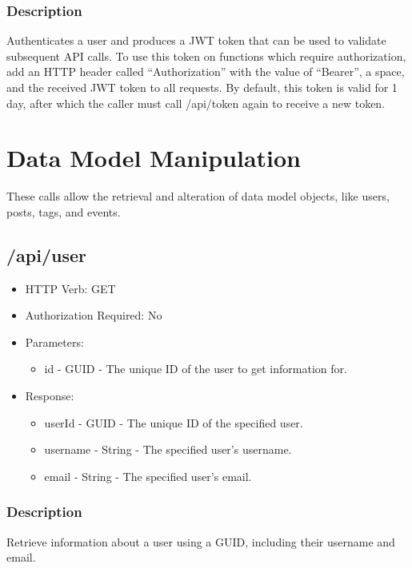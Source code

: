 \documentclass[12pt]{article}
\begin{document}
            \subsubsection{Description}
                Authenticates a user and produces a JWT token that can be used to validate subsequent API calls.
                To use this token on functions which require authorization, add an HTTP header called ``Authorization'' with the value of ``Bearer'', a space, and the received JWT token to all requests.
                By default, this token is valid for 1 day, after which the caller must call /api/token again to receive a new token.
    \section{Data Model Manipulation}
        These calls allow the retrieval and alteration of data model objects, like users, posts, tags, and events.

        \subsection{/api/user}
            \begin{itemize}
                \item HTTP Verb: GET
                \item Authorization Required: No
                \item Parameters:
                \begin{itemize}
                    \item id - GUID - The unique ID of the user to get information for.
                \end{itemize}
                \item Response:
                \begin{itemize}
                    \item userId - GUID - The unique ID of the specified user.
                    \item username - String - The specified user's username.
                    \item email - String - The specified user's email.
                \end{itemize}
            \end{itemize}
            \subsubsection{Description}
                Retrieve information about a user using a GUID, including their username and email.
\end{document}
